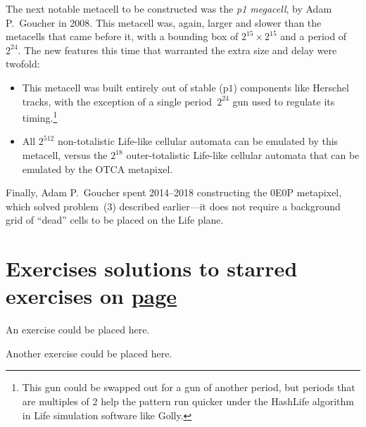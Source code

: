 The next notable metacell to be constructed was the \emph{p1 megacell}, by Adam P.~Goucher in 2008. This metacell was, again, larger and slower than the metacells that came before it, with a bounding box of $2^{15} \times 2^{15}$ and a period of $2^{24}$. The new features this time that warranted the extra size and delay were twofold:\smallskip

\begin{itemize}
	\item This metacell was built entirely out of stable (p$1$) components like Herschel tracks, with the exception of a single period~$2^{24}$ gun used to regulate its timing.\footnote{This gun could be swapped out for a gun of another period, but periods that are multiples of $2$ help the pattern run quicker under the HashLife algorithm in Life simulation software like Golly.}\smallskip
	
	\item All $2^{512}$ non-totalistic Life-like cellular automata can be emulated by this metacell, versus the $2^{18}$ outer-totalistic Life-like cellular automata that can be emulated by the OTCA metapixel.\smallskip
\end{itemize}


Finally, Adam P.~Goucher spent 2014--2018 constructing the 0E0P metapixel, which solved problem~(3) described earlier---it does not require a background grid of ``dead'' cells to be placed on the Life plane.




\section*{Exercises \hfill \normalfont\textsf{\small solutions to starred exercises on \hyperlink{solutions_0e0p}{page \pageref{solutions_0e0p}}}}
\label{sec:solutions_0e0p}
\vspace*{-0.4cm}\hrulefill\vspace*{-0.3cm}\footnotesize\begin{multicols}{2}\vspace*{-0.4cm}\raggedcolumns{}
\setlength{\parskip}{0pt}


\begin{problem}\label{exer:0e0p_ex1}
	An exercise could be placed here.
\end{problem}


\mfilbreak


\begin{problem}\label{exer:0e0p_ex2}
	Another exercise could be placed here.
\end{problem}


\end{multicols}
\normalsize\vspace*{0.01cm}

